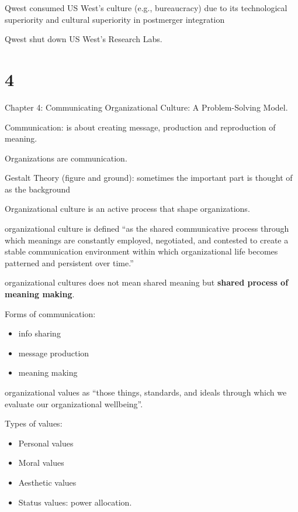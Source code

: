 \documentclass[
]{book}
\providecommand{\tightlist}{%
  \setlength{\itemsep}{0pt}\setlength{\parskip}{0pt}}
\begin{document}
Qwest consumed US West's culture (e.g., bureaucracy) due to its technological superiority and cultural superiority in postmerger integration

Qwest shut down US West's Research Labs.

\hypertarget{section}{%
\section{4}\label{section}}

Chapter 4: Communicating Organizational Culture: A Problem-Solving Model.

Communication: is about creating message, production and reproduction of meaning.

Organizations are communication.

Gestalt Theory (figure and ground): sometimes the important part is thought of as the background

Organizational culture is an active process that shape organizations.

organizational culture is defined ``as the shared communicative process through which meanings are constantly employed, negotiated, and contested to create a stable communication environment within which organizational life becomes patterned and persistent over time.''

organizational cultures does not mean shared meaning but \textbf{shared process of meaning making}.

Forms of communication:

\begin{itemize}
\tightlist
\item
  info sharing\\
\item
  message production\\
\item
  meaning making
\end{itemize}

organizational values as ``those things, standards, and ideals through which we evaluate our organizational wellbeing''.

Types of values:

\begin{itemize}
\tightlist
\item
  Personal values\\
\item
  Moral values\\
\item
  Aesthetic values\\
\item
  Status values: power allocation.
\end{itemize}
\end{document}
